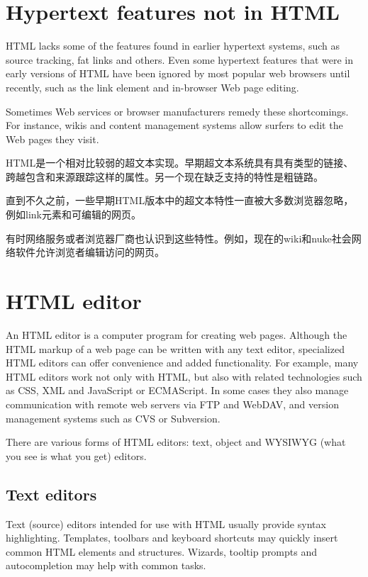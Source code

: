 \chapter{Hypertext features not in HTML}

HTML lacks some of the features found in earlier hypertext systems, such as source tracking, fat links and others. Even some hypertext features that were in early versions of HTML have been ignored by most popular web browsers until recently, such as the link element and in-browser Web page editing.

Sometimes Web services or browser manufacturers remedy these shortcomings. For instance, wikis and content management systems allow surfers to edit the Web pages they visit.

HTML是一个相对比较弱的超文本实现。早期超文本系统具有具有类型的链接、跨越包含和来源跟踪这样的属性。另一个现在缺乏支持的特性是粗链路。

直到不久之前，一些早期HTML版本中的超文本特性一直被大多数浏览器忽略，例如link元素和可编辑的网页。

有时网络服务或者浏览器厂商也认识到这些特性。例如，现在的wiki和nuke社会网络软件允许浏览者编辑访问的网页。

\chapter{HTML editor}

An HTML editor is a computer program for creating web pages. Although the HTML markup of a web page can be written with any text editor, specialized HTML editors can offer convenience and added functionality. For example, many HTML editors work not only with HTML, but also with related technologies such as CSS, XML and JavaScript or ECMAScript. In some cases they also manage communication with remote web servers via FTP and WebDAV, and version management systems such as CVS or Subversion.

There are various forms of HTML editors: text, object and WYSIWYG (what you see is what you get) editors.


\section{Text editors}

Text (source) editors intended for use with HTML usually provide syntax highlighting. Templates, toolbars and keyboard shortcuts may quickly insert common HTML elements and structures. Wizards, tooltip prompts and autocompletion may help with common tasks.

